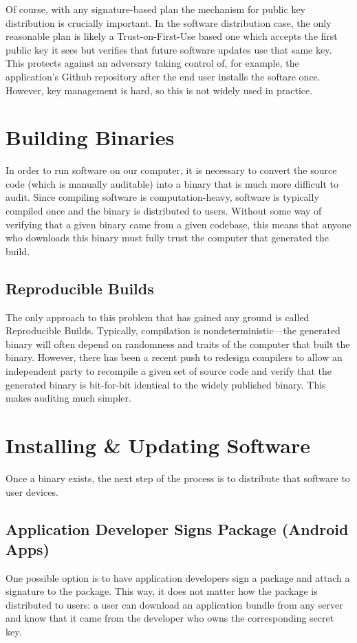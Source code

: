 Of course, with any signature-based plan the mechanism for public key distribution is crucially important. In the software distribution case, the only reasonable plan is likely a Trust-on-First-Use based one which accepts the first public key it sees but verifies that future software updates use that same key. This protects against an adversary taking control of, for example, the application's Github repository after the end user installs the softare once. However, key management is hard, so this is not widely used in practice.

\section{Building Binaries}
In order to run software on our computer, it is necessary to convert the source code (which is manually auditable) into a binary that is much more difficult to audit. Since compiling software is computation-heavy, software is typically compiled once and the binary is distributed to users. Without some way of verifying that a given binary came from a given codebase, this means that anyone who downloads this binary must fully trust the computer that generated the build. 

\subsection{Reproducible Builds}
The only approach to this problem that has gained any ground is called Reproducible Builds. Typically, compilation is nondeterministic---the generated binary will often depend on randomness and traits of the computer that built the binary. However, there has been a recent push to redesign compilers to allow an independent party to recompile a given set of source code and verify that the generated binary is bit-for-bit identical to the widely published binary. This makes auditing much simpler.

\section{Installing \& Updating Software}
Once a binary exists, the next step of the process is to distribute that software to user devices.

\subsection{Application Developer Signs Package (Android Apps)}
One possible option is to have application developers sign a package and attach a signature to the package. This way, it does not matter how the package is distributed to users: a user can download an application bundle from any server and know that it came from the developer who owns the corresponding secret key.


